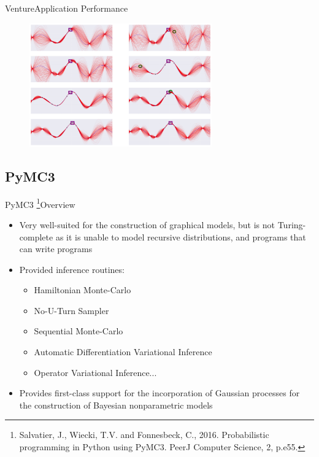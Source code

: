 \documentclass[AERbeamer%
              ,optEnglish%
              ,optBiber%
              ,optBibstyleAlphabetic%
              ,optBeamerClassicFormat%
              ]{AERlatex}%
\begin{document}
\begin{frame}[c]{Venture}{Application Performance}
    \centering
    \begin{figure}
        \centering
        \includegraphics[width=0.7\textwidth]{VentureBayesOptExampleViz.png}
    \end{figure}
\end{frame}



\subsection{PyMC3}
\begin{frame}[c]{PyMC3 \footnote{Salvatier, J., Wiecki, T.V. and Fonnesbeck, C., 2016. Probabilistic programming
                                 in Python using PyMC3. PeerJ Computer Science, 2, p.e55.}}{Overview}
    \centering
    \begin{itemize}
        \item Very well-suited for the construction of graphical models, but is not Turing-complete as it is unable to model
              recursive distributions, and programs that can write programs
        \item Provided inference routines:
        \begin{itemize}
            \item Hamiltonian Monte-Carlo
            \item No-U-Turn Sampler
            \item Sequential Monte-Carlo
            \item Automatic Differentiation Variational Inference
            \item Operator Variational Inference...
        \end{itemize}
        \item Provides first-class support for the incorporation of Gaussian processes for the construction of Bayesian nonparametric models
    \end{itemize}
\end{frame}
\end{document}
